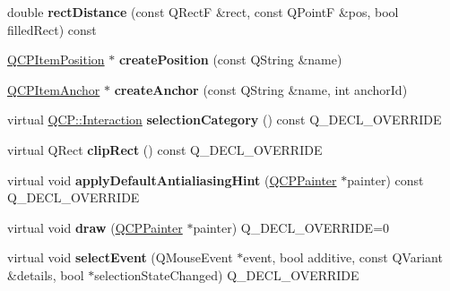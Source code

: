 \begin{DoxyCompactItemize}
\item 
double {\bfseries rect\+Distance} (const Q\+RectF \&rect, const Q\+PointF \&pos, bool filled\+Rect) const \hypertarget{class_q_c_p_abstract_item_a57cf4b9cecbfeb5f9e267481ecfe10cd}{}\label{class_q_c_p_abstract_item_a57cf4b9cecbfeb5f9e267481ecfe10cd}

\item 
\hyperlink{class_q_c_p_item_position}{Q\+C\+P\+Item\+Position} $\ast$ {\bfseries create\+Position} (const Q\+String \&name)\hypertarget{class_q_c_p_abstract_item_a75036d39c4d4e2e1a7dd145fff915d32}{}\label{class_q_c_p_abstract_item_a75036d39c4d4e2e1a7dd145fff915d32}

\item 
\hyperlink{class_q_c_p_item_anchor}{Q\+C\+P\+Item\+Anchor} $\ast$ {\bfseries create\+Anchor} (const Q\+String \&name, int anchor\+Id)\hypertarget{class_q_c_p_abstract_item_af3fc92527802078ca395138748b629a7}{}\label{class_q_c_p_abstract_item_af3fc92527802078ca395138748b629a7}

\item 
virtual \hyperlink{namespace_q_c_p_a2ad6bb6281c7c2d593d4277b44c2b037}{Q\+C\+P\+::\+Interaction} {\bfseries selection\+Category} () const Q\+\_\+\+D\+E\+C\+L\+\_\+\+O\+V\+E\+R\+R\+I\+DE\hypertarget{class_q_c_p_abstract_item_af1e8300bcca1524f8602038d78492571}{}\label{class_q_c_p_abstract_item_af1e8300bcca1524f8602038d78492571}

\item 
virtual Q\+Rect {\bfseries clip\+Rect} () const Q\+\_\+\+D\+E\+C\+L\+\_\+\+O\+V\+E\+R\+R\+I\+DE\hypertarget{class_q_c_p_abstract_item_a193ce2d0aea9466623d5a7de88596527}{}\label{class_q_c_p_abstract_item_a193ce2d0aea9466623d5a7de88596527}

\item 
virtual void {\bfseries apply\+Default\+Antialiasing\+Hint} (\hyperlink{class_q_c_p_painter}{Q\+C\+P\+Painter} $\ast$painter) const Q\+\_\+\+D\+E\+C\+L\+\_\+\+O\+V\+E\+R\+R\+I\+DE\hypertarget{class_q_c_p_abstract_item_a85dfa6ccd355c86d44e784a75042cca1}{}\label{class_q_c_p_abstract_item_a85dfa6ccd355c86d44e784a75042cca1}

\item 
virtual void {\bfseries draw} (\hyperlink{class_q_c_p_painter}{Q\+C\+P\+Painter} $\ast$painter) Q\+\_\+\+D\+E\+C\+L\+\_\+\+O\+V\+E\+R\+R\+I\+DE=0\hypertarget{class_q_c_p_abstract_item_afe12c077663d07233a1b06608783ae41}{}\label{class_q_c_p_abstract_item_afe12c077663d07233a1b06608783ae41}

\item 
virtual void {\bfseries select\+Event} (Q\+Mouse\+Event $\ast$event, bool additive, const Q\+Variant \&details, bool $\ast$selection\+State\+Changed) Q\+\_\+\+D\+E\+C\+L\+\_\+\+O\+V\+E\+R\+R\+I\+DE\hypertarget{class_q_c_p_abstract_item_ada0abcc22693f5fc224c0acd5bd568ea}{}\label{class_q_c_p_abstract_item_ada0abcc22693f5fc224c0acd5bd568ea}


\end{DoxyCompactItemize}
